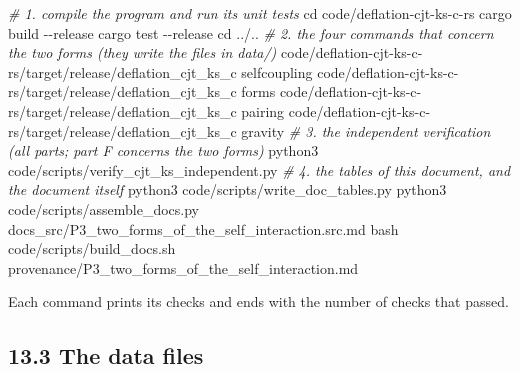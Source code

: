 \documentclass[
  10pt,
]{article}
\newenvironment{Shaded}{}{}
\newcommand{\AttributeTok}[1]{\textcolor[rgb]{0.49,0.56,0.16}{#1}}
\newcommand{\BuiltInTok}[1]{\textcolor[rgb]{0.00,0.50,0.00}{#1}}
\newcommand{\CommentTok}[1]{\textcolor[rgb]{0.38,0.63,0.69}{\textit{#1}}}
\newcommand{\ExtensionTok}[1]{#1}
\newcommand{\FunctionTok}[1]{\textcolor[rgb]{0.02,0.16,0.49}{#1}}
\newcommand{\NormalTok}[1]{#1}
\begin{document}
\begin{Shaded}
\begin{Highlighting}[]
\CommentTok{\# 1. compile the program and run its unit tests}
\BuiltInTok{cd}\NormalTok{ code/deflation{-}cjt{-}ks{-}c{-}rs}
\ExtensionTok{cargo}\NormalTok{ build }\AttributeTok{{-}{-}release}
\ExtensionTok{cargo}\NormalTok{ test }\AttributeTok{{-}{-}release}
\BuiltInTok{cd}\NormalTok{ ../..}
\CommentTok{\# 2. the four commands that concern the two forms (they write the files in data/)}
\ExtensionTok{code/deflation{-}cjt{-}ks{-}c{-}rs/target/release/deflation\_cjt\_ks\_c}\NormalTok{ selfcoupling}
\ExtensionTok{code/deflation{-}cjt{-}ks{-}c{-}rs/target/release/deflation\_cjt\_ks\_c}\NormalTok{ forms}
\ExtensionTok{code/deflation{-}cjt{-}ks{-}c{-}rs/target/release/deflation\_cjt\_ks\_c}\NormalTok{ pairing}
\ExtensionTok{code/deflation{-}cjt{-}ks{-}c{-}rs/target/release/deflation\_cjt\_ks\_c}\NormalTok{ gravity}
\CommentTok{\# 3. the independent verification (all parts; part F concerns the two forms)}
\ExtensionTok{python3}\NormalTok{ code/scripts/verify\_cjt\_ks\_independent.py}
\CommentTok{\# 4. the tables of this document, and the document itself}
\ExtensionTok{python3}\NormalTok{ code/scripts/write\_doc\_tables.py}
\ExtensionTok{python3}\NormalTok{ code/scripts/assemble\_docs.py docs\_src/P3\_two\_forms\_of\_the\_self\_interaction.src.md}
\FunctionTok{bash}\NormalTok{ code/scripts/build\_docs.sh provenance/P3\_two\_forms\_of\_the\_self\_interaction.md}
\end{Highlighting}
\end{Shaded}

Each command prints its checks and ends with the number of checks that
passed.

\hypertarget{the-data-files}{%
\subsection{13.3 The data files}\label{the-data-files}}
\end{document}
